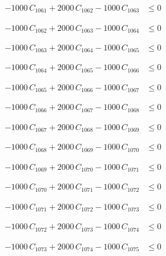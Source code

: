\documentclass[a4paper,11pt]{article}
\begin{document}
\begin{align}
-1000\,C_{1061} + 2000\,C_{1062} - 1000\,C_{1063} &\leq 0 \nonumber
\end{align}

\begin{align}
-1000\,C_{1062} + 2000\,C_{1063} - 1000\,C_{1064} &\leq 0 \nonumber
\end{align}

\begin{align}
-1000\,C_{1063} + 2000\,C_{1064} - 1000\,C_{1065} &\leq 0 \nonumber
\end{align}

\begin{align}
-1000\,C_{1064} + 2000\,C_{1065} - 1000\,C_{1066} &\leq 0 \nonumber
\end{align}

\begin{align}
-1000\,C_{1065} + 2000\,C_{1066} - 1000\,C_{1067} &\leq 0 \nonumber
\end{align}

\begin{align}
-1000\,C_{1066} + 2000\,C_{1067} - 1000\,C_{1068} &\leq 0 \nonumber
\end{align}

\begin{align}
-1000\,C_{1067} + 2000\,C_{1068} - 1000\,C_{1069} &\leq 0 \nonumber
\end{align}

\begin{align}
-1000\,C_{1068} + 2000\,C_{1069} - 1000\,C_{1070} &\leq 0 \nonumber
\end{align}

\begin{align}
-1000\,C_{1069} + 2000\,C_{1070} - 1000\,C_{1071} &\leq 0 \nonumber
\end{align}

\begin{align}
-1000\,C_{1070} + 2000\,C_{1071} - 1000\,C_{1072} &\leq 0 \nonumber
\end{align}

\begin{align}
-1000\,C_{1071} + 2000\,C_{1072} - 1000\,C_{1073} &\leq 0 \nonumber
\end{align}

\begin{align}
-1000\,C_{1072} + 2000\,C_{1073} - 1000\,C_{1074} &\leq 0 \nonumber
\end{align}

\begin{align}
-1000\,C_{1073} + 2000\,C_{1074} - 1000\,C_{1075} &\leq 0 \nonumber
\end{align}
\end{document}
